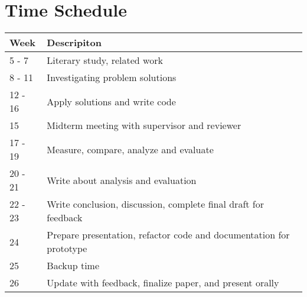 \documentclass[a4paper,11pt,dvipsnames]{article}
\begin{document}
	\section*{Time Schedule}
	\vspace{1.5cm}
	\begin{center}
		\begin{tabular}{ |m{1.5cm}|m{30em} | } 
			\hline
			\textbf{Week} & \textbf{Descripiton}\\
			\hline
			
			5 - 7 & Literary study, related work \\ 
			8 - 11 & Investigating problem solutions \\ 
			12 - 16 & Apply solutions and write code \\
			15 & Midterm meeting with supervisor and reviewer \\ 
			17 - 19 & Measure, compare, analyze and evaluate \\ 
			20 - 21 & Write about analysis and evaluation \\
			22 - 23 & Write conclusion, discussion, complete final draft 
			for feedback \\
			24  & Prepare presentation, refactor code and documentation 
			for prototype \\
			25 & Backup time \\
			26 & Update with feedback, finalize paper, and present orally\\
			
			\hline
		\end{tabular}
	\end{center}
	
	
	
\end{document}
